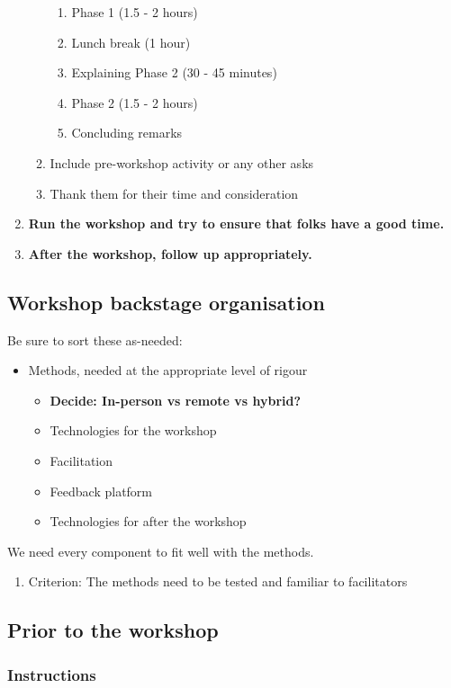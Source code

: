 \documentclass[11pt]{article}
\begin{document}
\begin{enumerate}
\begin{enumerate}
\begin{enumerate}
\item Phase 1 (1.5 - 2 hours)
\item Lunch break (1 hour)
\item Explaining Phase 2 (30 - 45 minutes)
\item Phase 2 (1.5 - 2 hours)
\item Concluding remarks
\end{enumerate}
\item Include pre-workshop activity or any other asks
\item Thank them for their time and consideration
\end{enumerate}
\item \textbf{Run the workshop and try to ensure that folks have a good time.}
\item \textbf{After the workshop, follow up appropriately.}
\end{enumerate}
\subsection{Workshop backstage organisation}
\label{781d52fa-71a9-4c90-b4f6-9b0dd4244c33}
Be sure to sort these as-needed:

\begin{itemize}
\item Methods, needed at the appropriate level of rigour
\begin{itemize}
\item \textbf{Decide: In-person vs remote vs hybrid?}
\item Technologies for the workshop
\item Facilitation
\item Feedback platform
\item Technologies for after the workshop
\end{itemize}
\end{itemize}

We need every component to fit well with the methods.

\begin{enumerate}
\item Criterion: The methods need to be tested and familiar to facilitators
\label{sec:orgf45df24}
\end{enumerate}
\subsection{Prior to the workshop}
\label{9accd402-6d28-4ee2-ac35-44b4fe682d53}
\subsubsection{Instructions}
\label{sec:org9a4ba9e}
\end{document}
